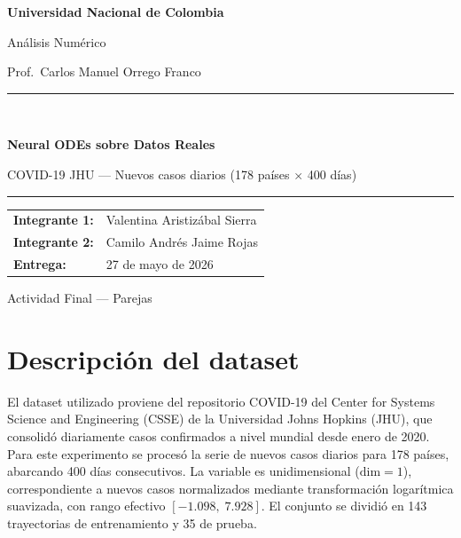 \documentclass[12pt,a4paper]{article}
\begin{document}
\begin{titlepage}
  \centering
  \vspace*{1cm}
  {\Large\bfseries\color{unal} Universidad Nacional de Colombia\par}
  \vspace{0.3cm}
  {\large Análisis Numérico\par}
  {\normalsize Prof.\ Carlos Manuel Orrego Franco\par}
  \vspace{1.5cm}
  \rule{\linewidth}{1.5pt}\\[0.4cm]
  {\Huge\bfseries Neural ODEs sobre Datos Reales\par}
  \vspace{0.3cm}
  {\large COVID-19 JHU --- Nuevos casos diarios (178 países $\times$ 400 días)\par}
  \rule{\linewidth}{1.5pt}
  \vspace{1.5cm}

  \begin{tabular}{ll}
    \textbf{Integrante 1:} & Valentina Aristizábal Sierra \\[4pt]
    \textbf{Integrante 2:} & Camilo Andrés Jaime Rojas \\[4pt]
    \textbf{Entrega:}      & 27 de mayo de 2026 \\
  \end{tabular}

  \vfill
  {\small Actividad Final --- Parejas}
\end{titlepage}

\tableofcontents
\newpage

\section{Descripción del dataset}
\label{sec:dataset}

El dataset utilizado proviene del repositorio COVID-19 del Center for Systems
Science and Engineering (CSSE) de la Universidad Johns Hopkins (JHU), que
consolidó diariamente casos confirmados a nivel mundial desde enero de 2020.
Para este experimento se procesó la serie de nuevos casos diarios para 178
países, abarcando 400 días consecutivos.
La variable es unidimensional ($\text{dim}=1$), correspondiente a nuevos casos
normalizados mediante transformación logarítmica suavizada, con rango efectivo
$[-1.098,\;7.928]$.
El conjunto se dividió en 143 trayectorias de entrenamiento y 35 de prueba.
\end{document}
